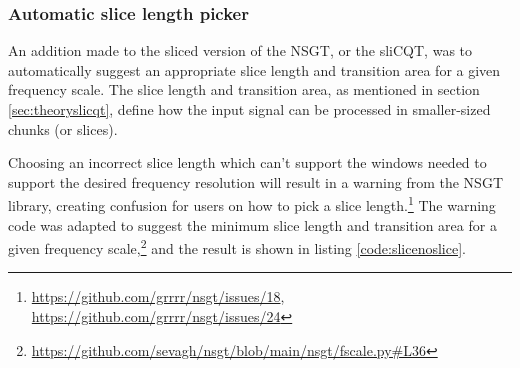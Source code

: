 \documentclass[report.tex]{subfiles}
\begin{document}
\subsubsection{Automatic slice length picker}
\label{sec:autosllen}

An addition made to the sliced version of the NSGT, or the sliCQT, was to automatically suggest an appropriate slice length and transition area for a given frequency scale. The slice length and transition area, as mentioned in section \ref{sec:theoryslicqt}, define how the input signal can be processed in smaller-sized chunks (or slices).

Choosing an incorrect slice length which can't support the windows needed to support the desired frequency resolution will result in a warning from the NSGT library, creating confusion for users on how to pick a slice length.\footnote{\url{https://github.com/grrrr/nsgt/issues/18}, \url{https://github.com/grrrr/nsgt/issues/24}} The warning code was adapted to suggest the minimum slice length and transition area for a given frequency scale,\footnote{\url{https://github.com/sevagh/nsgt/blob/main/nsgt/fscale.py\#L36}} and the result is shown in listing \ref{code:slicenoslice}.
\end{document}

